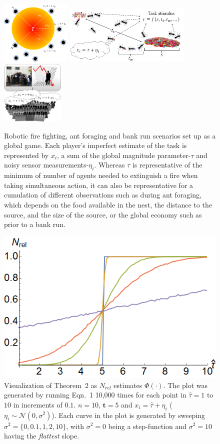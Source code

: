 \documentclass[12pt]{article}
\def\td{\mathbf{t}}   %
\begin{document}
\begin{figure}[!ht]
	\centering\includegraphics[height=1.2in]{figures/firefighting.png}
		\centering\includegraphics[height=1.1in]{figures/foraging.png}
	\centering\includegraphics[height=1.2in]
{figures/bankrun.png}
	\centering\caption{Robotic fire fighting, ant foraging and bank run scenarios set up as a global game. Each player's imperfect estimate of the task is represented by $x_i$, a sum of the global magnitude parameter-$\tau$ and noisy sensor measurements-$\eta_i$. Whereas $\tau$ is representative of the minimum of number of agents needed to extinguish a fire when taking simultaneous action, it can also be representative for a cumulation of different observations such as during ant foraging, which depends on the food available in the nest, the distance to the source, and the size of the source, or the global economy such as prior to a bank run.}\vspace{-10px}
\end{figure}

\newpage
\begin{figure}[!ht]
	\centering\includegraphics[width=0.3\columnwidth]{figures/thm2fig.png}
	\centering\caption{Visualization of Theorem~2 as $N_{rel}$ estimates $\Phi(\cdot)$. The plot was generated by running Eqn.~1 10,000 times for each point in $\hat{\tau} = 1$ to $10$ in increments of $0.1$. $n = 10$, $\td = 5$ and $x_i = \hat{\tau} + \eta_i$ ($\eta_i \sim\mathcal{N}(0, \sigma^2)$). Each curve in the plot is generated by sweeping $\sigma^2 = \{0, 0.1, 1, 2, 10\}$, with $\sigma^2 = 0$ being a step-function and $\sigma^2 = 10$ having the \emph{flattest} slope.}\label{fig:thm2fig}
\end{figure}
\end{document}
